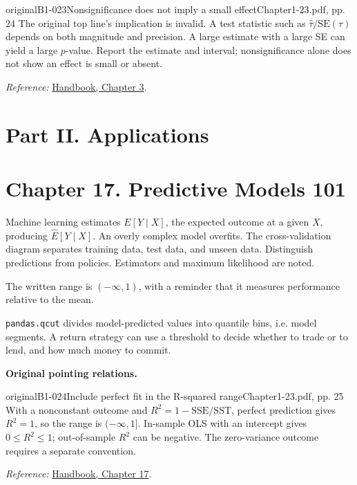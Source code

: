 {\begin{reviewnote}{original}{B1-023}{Nonsignificance does not imply a small effect}{Chapter1-23.pdf, pp. 24}
The original top line's implication is invalid. A test statistic such as $\hat\tau/\mathrm{SE}(\hat\tau)$ depends on both magnitude and precision. A large estimate with a large SE can yield a large $p$-value. Report the estimate and interval; nonsignificance alone does not show an effect is small or absent.
\par\smallskip\textit{Reference:} \href{https://matheusfacure.github.io/python-causality-handbook/03-Stats-Review-The-Most-Dangerous-Equation.html}{Handbook, Chapter 3}.
\end{reviewnote}
\section{Part II. Applications}
\section{Chapter 17. Predictive Models 101}
Machine learning estimates $E[Y\mid X]$, the expected outcome at a given $X$, producing $\widehat E[Y\mid X]$. An overly complex model overfits. The cross-validation diagram separates training data, test data, and unseen data. Distinguish predictions from policies. Estimators and maximum likelihood are noted.

 The written range is $(-\infty,1)$, with a reminder that it measures performance relative to the mean. 

\texttt{pandas.qcut} divides model-predicted values into quantile bins, i.e. model segments. A return strategy can use a threshold to decide whether to trade or to lend, and how much money to commit.

\par{}\smallskip\textbf{Original pointing relations.}\par\smallskip
{}
\begin{reviewnote}{original}{B1-024}{Include perfect fit in the R-squared range}{Chapter1-23.pdf, pp. 25}
With a nonconstant outcome and $R^2=1-\mathrm{SSE}/\mathrm{SST}$, perfect prediction gives $R^2=1$, so the range is $(-\infty,1]$. In-sample OLS with an intercept gives $0\le R^2\le1$; out-of-sample $R^2$ can be negative. The zero-variance outcome requires a separate convention.
\par\smallskip\textit{Reference:} \href{https://matheusfacure.github.io/python-causality-handbook/17-Predictive-Models-101.html}{Handbook, Chapter 17}.
\end{reviewnote}
}
